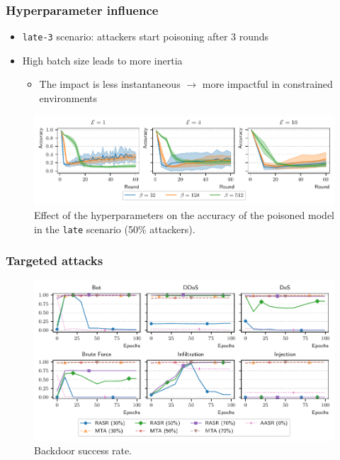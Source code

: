 \documentclass[color,t,presentation,english,aspectratio=169]{beamer}
\begin{document}
\begin{frame}
	\frametitle{Hyperparameter influence}

	\begin{itemize}
		\item \texttt{late-3} scenario: attackers start poisoning after 3 rounds
		\item High batch size leads to more inertia
		\begin{itemize}
			\item The impact is less instantaneous $\rightarrow$ more impactful in constrained environments
		\end{itemize}
	\end{itemize}

	\begin{figure}
		\centering
		\includegraphics[width=\textwidth]{figures/hyperparams-late.pdf}
		\vspace{-2ex}
		\begin{minipage}{.7\textwidth}
			\caption{Effect of the hyperparameters on the accuracy of the poisoned model in the \texttt{late} scenario (50\% attackers).}
		\end{minipage}
	\end{figure}
\end{frame}

\begin{frame}

	\frametitle{Targeted attacks}
	\begin{figure}
		\centering
		\includegraphics[width=.8\textwidth]{figures/backdoors.pdf}
		\caption{Backdoor success rate.}
	\end{figure}

\end{frame}
\end{document}
